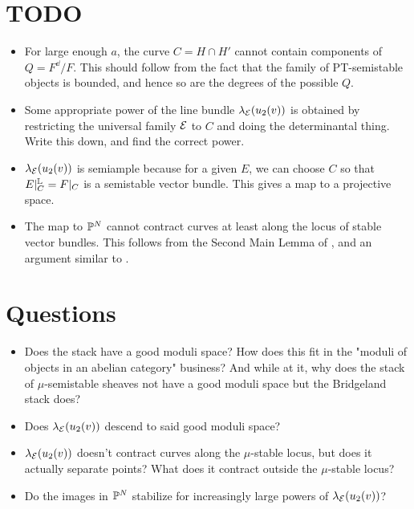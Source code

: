 \section{TODO}
\begin{itemize}
    \item For large enough $a$, the curve $C = H \cap H'$ cannot contain components of $Q = F^\dd/F$. This should follow from the fact that the family of PT-semistable objects is bounded, and hence so are the degrees of the possible $Q$.
    \item Some appropriate power of the line bundle $\lambda_{\mathcal{E}}(u_2(v))$ is obtained by restricting the universal family $\mathcal{E}$ to $C$ and doing the determinantal thing. Write this down, and find the correct power.
    \item $\lambda_{\mathcal{E}}(u_2(v))$ is semiample because for a given $E$, we can choose $C$ so that $E|^{\mathbb{L}}_C = F|_C$ is a semistable vector bundle. This gives a map to a projective space.
    \item The map to $\mathbb{P}^N$ cannot contract curves at least along the locus of stable vector bundles. This follows from the Second Main Lemma of \cite{seshadri}, and an argument similar to \cite[Lemma 8.2.12]{HL}.
\end{itemize}

\section{Questions}
\begin{itemize}
    \item Does the stack have a good moduli space? How does this fit in the "moduli of objects in an abelian category" business? And while at it, why does the stack of $\mu$-semistable sheaves not have a good moduli space but the Bridgeland stack does?
    \item Does $\lambda_{\mathcal{E}}(u_2(v))$ descend to said good moduli space?
    \item $\lambda_{\mathcal{E}}(u_2(v))$ doesn't contract curves along the $\mu$-stable locus, but does it actually separate points? What does it contract outside the $\mu$-stable locus?
    \item Do the images in $\mathbb{P}^N$ stabilize for increasingly large powers of $\lambda_{\mathcal{E}}(u_2(v))$?
\end{itemize}

